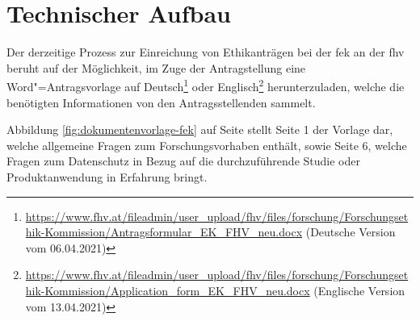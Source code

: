 \documentclass[a4paper,12pt,twoside]{scrreprt}
\begin{document}
\section{Technischer Aufbau}
\label{sec:technischer-aufbau}

Der derzeitige Prozess zur Einreichung von Ethikanträgen bei der \ac{fek} an der \ac{fhv} beruht auf der Möglichkeit, im Zuge der Antragstellung eine Word"=Antragsvorlage auf Deutsch\footnote{\url{https://www.fhv.at/fileadmin/user_upload/fhv/files/forschung/Forschungsethik-Kommission/Antragsformular_EK_FHV_neu.docx} (Deutsche Version vom 06.04.2021)} oder Englisch\footnote{\url{https://www.fhv.at/fileadmin/user_upload/fhv/files/forschung/Forschungsethik-Kommission/Application_form_EK_FHV_neu.docx} (Englische Version vom 13.04.2021)} herunterzuladen, welche die benötigten Informationen von den Antragsstellenden sammelt.

Abbildung \ref{fig:dokumentenvorlage-fek} auf Seite \pageref{fig:dokumentenvorlage-fek} stellt Seite 1 der Vorlage dar, welche allgemeine Fragen zum Forschungsvorhaben enthält, sowie Seite 6, welche Fragen zum Datenschutz in Bezug auf die durchzuführende Studie oder Produktanwendung in Erfahrung bringt.
\end{document}
